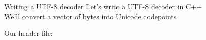 \documentclass[../index.tex]{subfiles}
\begin{document}
\renewcommand{\currenttitle}{Writing a UTF-8 decoder}
\newcommand{\decoderheaderlisting}[2]{%
}
\begin{frame}{\currenttitle}
%
%
%
%
%
  Let's write a UTF-8 decoder in C++ \\

  We'll convert a vector of bytes into Unicode codepoints \\

  \vspace*{2em}

  Our header file:

  \decoderheaderlisting{4}{7}
\end{frame}
\end{document}
